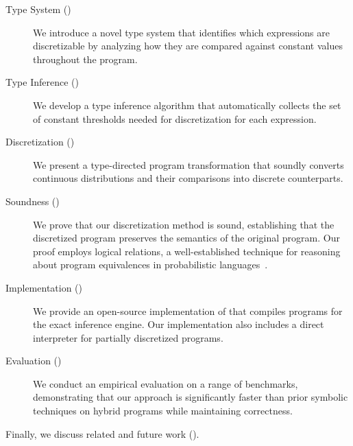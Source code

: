 \begin{description}
    \item[Type System ()] We introduce a novel type system that identifies which expressions are discretizable by analyzing how they are compared against constant values throughout the program.

    \item[Type Inference ()] We develop a type inference algorithm that automatically collects the set of constant thresholds needed for discretization for each expression.

    \item[Discretization ()] We present a type-directed program transformation that soundly converts continuous distributions and their comparisons into discrete counterparts.

    \item[Soundness ()] We prove that our discretization method is sound, establishing that the discretized program preserves the semantics of the original program. Our proof employs logical relations, a well-established technique for reasoning about program equivalences in probabilistic languages~\cite{Bizjak2015Step,Wand2018Contextual}.

    \item[Implementation ()] We provide an open-source implementation of \Slice{} that compiles programs for the \Dice{} exact inference engine. Our implementation also includes a direct interpreter for partially discretized programs.

    \item[Evaluation ()] We conduct an empirical evaluation on a range of benchmarks, demonstrating that our approach is significantly faster than prior symbolic techniques on hybrid programs while maintaining correctness.
\end{description}

Finally, we discuss related and future work ().

